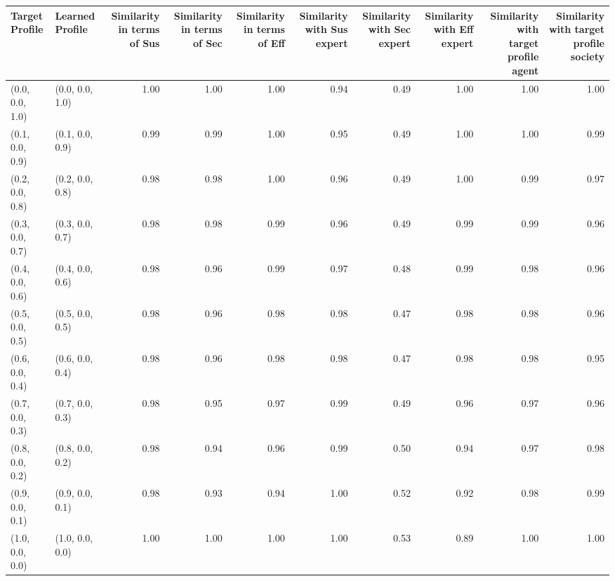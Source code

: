 \begin{tabular}{llrrrrrrrr}
\toprule
Target Profile & Learned Profile & Similarity in terms of Sus & Similarity in terms of Sec & Similarity in terms of Eff & Similarity with Sus expert & Similarity with Sec expert & Similarity with Eff expert & Similarity with target profile agent & Similarity with target profile society \\
\midrule
(0.0, 0.0, 1.0) & (0.0, 0.0, 1.0) & 1.00 & 1.00 & 1.00 & 0.94 & 0.49 & 1.00 & 1.00 & 1.00 \\
(0.1, 0.0, 0.9) & (0.1, 0.0, 0.9) & 0.99 & 0.99 & 1.00 & 0.95 & 0.49 & 1.00 & 1.00 & 0.99 \\
(0.2, 0.0, 0.8) & (0.2, 0.0, 0.8) & 0.98 & 0.98 & 1.00 & 0.96 & 0.49 & 1.00 & 0.99 & 0.97 \\
(0.3, 0.0, 0.7) & (0.3, 0.0, 0.7) & 0.98 & 0.98 & 0.99 & 0.96 & 0.49 & 0.99 & 0.99 & 0.96 \\
(0.4, 0.0, 0.6) & (0.4, 0.0, 0.6) & 0.98 & 0.96 & 0.99 & 0.97 & 0.48 & 0.99 & 0.98 & 0.96 \\
(0.5, 0.0, 0.5) & (0.5, 0.0, 0.5) & 0.98 & 0.96 & 0.98 & 0.98 & 0.47 & 0.98 & 0.98 & 0.96 \\
(0.6, 0.0, 0.4) & (0.6, 0.0, 0.4) & 0.98 & 0.96 & 0.98 & 0.98 & 0.47 & 0.98 & 0.98 & 0.95 \\
(0.7, 0.0, 0.3) & (0.7, 0.0, 0.3) & 0.98 & 0.95 & 0.97 & 0.99 & 0.49 & 0.96 & 0.97 & 0.96 \\
(0.8, 0.0, 0.2) & (0.8, 0.0, 0.2) & 0.98 & 0.94 & 0.96 & 0.99 & 0.50 & 0.94 & 0.97 & 0.98 \\
(0.9, 0.0, 0.1) & (0.9, 0.0, 0.1) & 0.98 & 0.93 & 0.94 & 1.00 & 0.52 & 0.92 & 0.98 & 0.99 \\
(1.0, 0.0, 0.0) & (1.0, 0.0, 0.0) & 1.00 & 1.00 & 1.00 & 1.00 & 0.53 & 0.89 & 1.00 & 1.00 \\
\bottomrule
\end{tabular}
